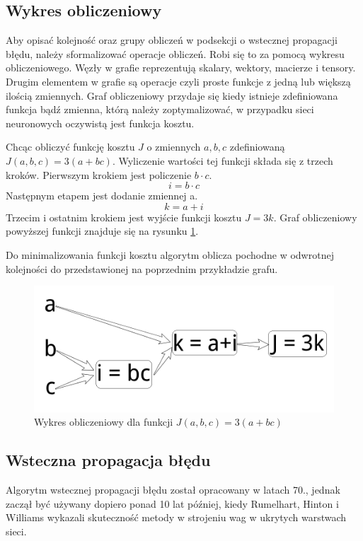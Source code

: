 \documentclass[12pt,a4paper,twoside,titlepage,openright]{book}
\begin{document}
\begin{itemize}
\subsection{Wykres obliczeniowy}
Aby opisać kolejność oraz grupy obliczeń w podsekcji o wstecznej propagacji błędu, należy sformalizować operacje obliczeń. Robi się to za pomocą wykresu obliczeniowego. Węzły w grafie reprezentują skalary, wektory, macierze i tensory. Drugim elementem w grafie są operacje czyli proste funkcje z jedną lub większą ilością zmiennych. Graf obliczeniowy przydaje się kiedy istnieje zdefiniowana funkcja bądź zmienna, którą należy zoptymalizować, w przypadku sieci neuronowych oczywistą jest funkcja kosztu.

Chcąc obliczyć funkcję kosztu \(J\) o zmiennych \(a,b,c\) zdefiniowaną \(J(a,b,c) = 3(a+bc)\). Wyliczenie wartości tej funkcji składa się z trzech kroków. Pierwszym krokiem jest policzenie \(b \cdot c\).
$$i = b \cdot c$$
Następnym etapem jest dodanie zmiennej a.
$$k = a + i$$
Trzecim i ostatnim krokiem jest wyjście funkcji kosztu \(J = 3k\).
Graf obliczeniowy powyższej funkcji znajduje się na rysunku \ref{fig:costFunction}.

Do minimalizowania funkcji kosztu algorytm oblicza pochodne w odwrotnej kolejności do przedstawionej na poprzednim przykładzie grafu.

\begin{figure}[ht]
	\centering
			\includegraphics[resolution=100, scale=0.4]{ComputationGraph.png}
		\caption{Wykres obliczeniowy dla funkcji \(J(a,b,c) = 3(a+bc)\)}
				\label{fig:costFunction}
\end{figure}

\subsection{Wsteczna propagacja błędu}
Algorytm wstecznej propagacji błędu został opracowany w latach 70., jednak zaczął być używany dopiero ponad 10 lat później, kiedy Rumelhart, Hinton i Williams wykazali skuteczność metody w strojeniu wag w ukrytych warstwach sieci.


\end{itemize}
\end{document}
